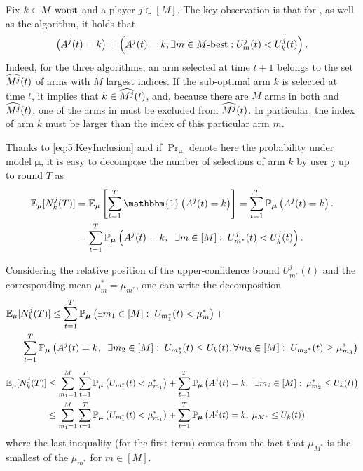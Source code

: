 \begin{smallproof}
  Fix $k\in M\text{-}\mathrm{worst}$ and a player $j \in [M]$.
  The key observation is that for \MCTopM, \RandTopM{} as well as the \rhoRand{} algorithm, it holds that
  \begin{equation}\left(A^j(t) = k\right) = \left(A^j(t) = k , \exists m \in M\text{-}\mathrm{best} : U_m^j(t) < U_k^j(t) \right).\label{eq:5:KeyInclusion}\end{equation}
  Indeed, for the three algorithms, an arm selected at time $t+1$ belongs to the set $\widehat{M^j}(t)$ of arms with $M$ largest indices.
  If the sub-optimal arm $k$ is selected at time $t$, it implies that $k \in \widehat{M^j}(t)$, and, because there are $M$ arms in both \Mbest{} and $\widehat{M^j}(t)$, one of the arms in \Mbest{} must be excluded from $\widehat{M^j}(t)$.
  In particular, the index of arm $k$ must be larger than the index of this particular arm $m$.

  Thanks to \eqref{eq:5:KeyInclusion} and if $\Pr_{\bm{\mu}} $ denote here the probability under model $\bm{\mu}$, it is easy to decompose the number of selections of arm $k$ by user $j$ up to round $T$ as
  \begin{align*}
  \E_{\mu}[N_k^j(T)]
  &= \E_{\mu}\left[ \sum_{t=1}^T \mathbbm{1}\left( A^j(t) = k \right) \right]
  = \sum_{t=1}^T \Pr_{\bm{\mu}} \left( A^j(t) = k \right).\\
  &= \sum_{t=1}^T \Pr_{\bm{\mu}} \left( A^j(t) = k,\;\; \exists m \in[M]:\; U_{m^*}^j(t) < U_k^j(t) \right).
  \end{align*}

  Considering the relative position of the upper-confidence bound $U_{m^*}^j(t)$ and the corresponding mean $\mu_m^* = \mu_{m^*}$, one can write the decomposition
  \begin{align*}
    \mathbb{E}_{\mu}[N_k^j(T)] &\leq
    \sum_{t=1}^T\mathbb{P}_{\bm{\mu}} \left( \exists m_1 \in [M]: \; U_{m_1^*}(t) < \mu_m^* \right) + \\
    \;\;\;\;
    \sum_{t=1}^T\mathbb{P}_{\bm{\mu}} & \left(A^j(t) = k,\;\; \exists m_2 \in [M]:\; U_{m_2^*}(t) \leq U_k(t) , \forall {m_3} \in [M]: \;  U_{{m_3}^*}(t) \geq \mu_{m_3}^* \right)
  \end{align*}
  \begin{align}
    \mathbb{E}_{\mu}[N_k^j(T)] &\leq \sum_{m_1=1}^M\sum_{t=1}^T\mathbb{P}_{\bm{\mu}} \left(U_{m_1^*}(t) < \mu_{m_1}^* \right) + \sum_{t=1}^T\mathbb{P}_{\bm{\mu}} \left(A^j(t) = k,\;\; \exists m_2 \in [M]:\; \mu_{m_2}^* \leq U_k(t)\right) \notag \\
    & \leq \sum_{m_1=1}^M \sum_{t=1}^T \mathbb{P}_{\bm{\mu}} \left( U_{m_1^*}(t) < \mu_{m_1}^* \right)
    + \sum_{t=1}^T \mathbb{P}_{\bm{\mu}} \left( A^j(t) = k,\; \mu_{M^*} \leq U_k(t) \right)
    \label{eq:5:sumOfProbaForTkj}
  \end{align}
  where the last inequality (for the first term) comes from the fact that $\mu_{M^*}$ is the smallest of the $\mu_{m^*}$ for $m \in [M]$.


\end{smallproof}

